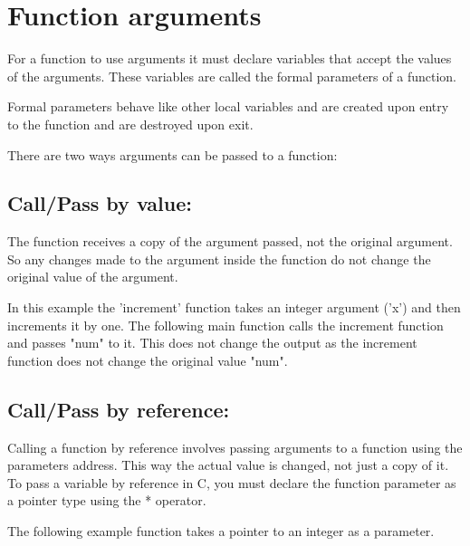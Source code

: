 \documentclass[
	12pt, %
]{fphw}
\begin{document}
\section*{Function arguments}
For a function to use arguments it must declare variables that accept the values
of the arguments. These variables are called the formal parameters of a function.

Formal parameters behave like other local variables and are created upon entry
to the function and are destroyed upon exit.

There are two ways arguments can be passed to a function:

\subsection*{Call/Pass by value:}
The function receives a copy of the argument passed, not the original argument.
So any changes made to the argument inside the function do not change the original
value of the argument.
		

\begin{problem}
	
	In this example the 'increment' function takes an integer argument ('x') 
	and then increments it by one. The following main function calls the 
	increment function and passes "num" to it. This does not change the output 
	as the increment function does not change the original value "num".
\end{problem}

\subsection*{Call/Pass by reference:}
Calling a function by reference involves passing arguments to a function using
the parameters address. This way the actual value is changed, not just a copy
of it.\\

To pass a variable by reference in C, you must declare the function parameter 
as a pointer type using the * operator.\\

\clearpage

The following example function takes a pointer to an integer as a parameter.
\end{document}
